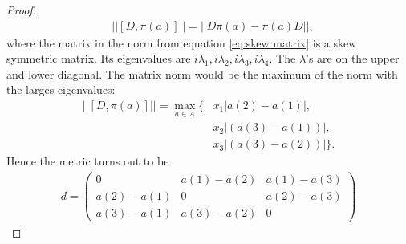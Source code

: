 \begin{proof}
    \begin{align}\label{eq:skew matrix}
        &\big|\big|[D, \pi(a)]\big|\big| = \big|\big|D\pi(a) - \pi(a)D\big|\big|,
    \end{align}
    where the matrix in the norm from equation \eqref{eq:skew matrix} is a
    skew symmetric matrix. Its eigenvalues are $i\lambda_1, i\lambda_2,
    i\lambda_3, i\lambda_4$. The $\lambda$'s are on the upper and lower
    diagonal. The matrix norm would be the maximum of the norm with the
    larges eigenvalues:
    \begin{align}
        \big|\big|[D, \pi(a)]\big|\big| = \max_{a\in A}\bigg\{&x_1\big|a(2)-a(1)\big|,\nonumber\\ &x_2\big|(a(3)-a(1))\big|,\nonumber\\
        &x_3\big|(a(3)-a(2))\big|\bigg\}.
    \end{align}
    Hence the metric turns out to be
    \begin{align}
        d =
        \begin{pmatrix}
            0 & a(1)-a(2) & a(1)-a(3)\\
            a(2)-a(1) & 0 & a(2)-a(3)\\
            a(3)-a(1) & a(3)-a(2) & 0
        \end{pmatrix}
    \end{align}


\end{proof}
